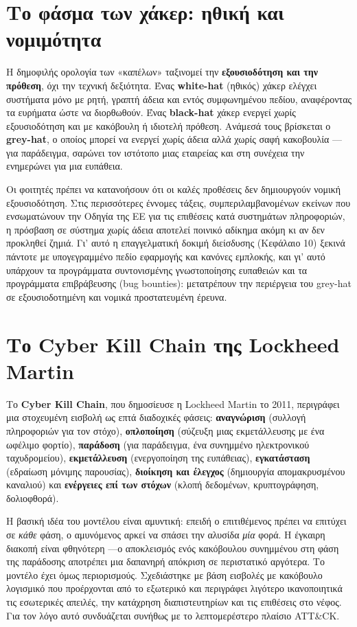 \section{Το φάσμα των χάκερ: ηθική και νομιμότητα}\label{sec:3.2}
Η δημοφιλής ορολογία των «καπέλων» ταξινομεί την \textbf{εξουσιοδότηση και την πρόθεση}, όχι την τεχνική δεξιότητα. Ένας \textbf{white-hat} (ηθικός) χάκερ ελέγχει συστήματα μόνο με ρητή, γραπτή άδεια και εντός συμφωνημένου πεδίου, αναφέροντας τα ευρήματα ώστε να διορθωθούν. Ένας \textbf{black-hat} χάκερ ενεργεί χωρίς εξουσιοδότηση και με κακόβουλη ή ιδιοτελή πρόθεση. Ανάμεσά τους βρίσκεται ο \textbf{grey-hat}, ο οποίος μπορεί να ενεργεί χωρίς άδεια αλλά χωρίς σαφή κακοβουλία —για παράδειγμα, σαρώνει τον ιστότοπο μιας εταιρείας και στη συνέχεια την ενημερώνει για μια ευπάθεια.

Οι φοιτητές πρέπει να κατανοήσουν ότι οι καλές προθέσεις δεν δημιουργούν νομική εξουσιοδότηση. Στις περισσότερες έννομες τάξεις, συμπεριλαμβανομένων εκείνων που ενσωματώνουν την Οδηγία της ΕΕ για τις επιθέσεις κατά συστημάτων πληροφοριών, η πρόσβαση σε σύστημα χωρίς άδεια αποτελεί ποινικό αδίκημα ακόμη κι αν δεν προκληθεί ζημιά. Γι' αυτό η επαγγελματική δοκιμή διείσδυσης (Κεφάλαιο 10) ξεκινά πάντοτε με υπογεγραμμένο πεδίο εφαρμογής και κανόνες εμπλοκής, και γι' αυτό υπάρχουν τα προγράμματα συντονισμένης γνωστοποίησης ευπαθειών και τα προγράμματα επιβράβευσης (bug bounties): μετατρέπουν την περιέργεια του grey-hat σε εξουσιοδοτημένη και νομικά προστατευμένη έρευνα.

\section{Το Cyber Kill Chain της Lockheed Martin}\label{sec:3.3}
Το \textbf{Cyber Kill Chain}, που δημοσίευσε η Lockheed Martin το 2011, περιγράφει μια στοχευμένη εισβολή ως επτά διαδοχικές φάσεις: \textbf{αναγνώριση} (συλλογή πληροφοριών για τον στόχο), \textbf{οπλοποίηση} (σύζευξη μιας εκμετάλλευσης με ένα ωφέλιμο φορτίο), \textbf{παράδοση} (για παράδειγμα, ένα συνημμένο ηλεκτρονικού ταχυδρομείου), \textbf{εκμετάλλευση} (ενεργοποίηση της ευπάθειας), \textbf{εγκατάσταση} (εδραίωση μόνιμης παρουσίας), \textbf{διοίκηση και έλεγχος} (δημιουργία απομακρυσμένου καναλιού) και \textbf{ενέργειες επί των στόχων} (κλοπή δεδομένων, κρυπτογράφηση, δολιοφθορά).

Η βασική ιδέα του μοντέλου είναι αμυντική: επειδή ο επιτιθέμενος πρέπει να επιτύχει σε \emph{κάθε} φάση, ο αμυνόμενος αρκεί να σπάσει την αλυσίδα \emph{μία} φορά. Η έγκαιρη διακοπή είναι φθηνότερη —ο αποκλεισμός ενός κακόβουλου συνημμένου στη φάση της παράδοσης αποτρέπει μια δαπανηρή απόκριση σε περιστατικό αργότερα. Το μοντέλο έχει όμως περιορισμούς. Σχεδιάστηκε με βάση εισβολές με κακόβουλο λογισμικό που προέρχονται από το εξωτερικό και περιγράφει λιγότερο ικανοποιητικά τις εσωτερικές απειλές, την κατάχρηση διαπιστευτηρίων και τις επιθέσεις στο νέφος. Για τον λόγο αυτό συνδυάζεται συνήθως με το λεπτομερέστερο πλαίσιο ATT\&CK.

